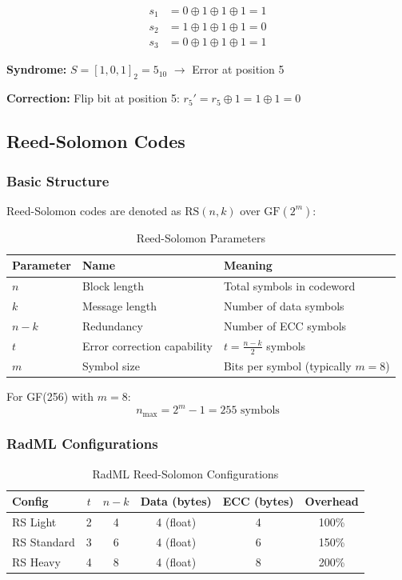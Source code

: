 \documentclass[11pt,a4paper]{article}
\begin{document}
\begin{align}
s_1 &= 0 \oplus 1 \oplus 1 \oplus 1 = 1 \\
s_2 &= 1 \oplus 1 \oplus 1 \oplus 1 = 0 \\
s_3 &= 0 \oplus 1 \oplus 1 \oplus 1 = 1
\end{align}

\textbf{Syndrome:} $S = [1, 0, 1]_2 = 5_{10}$ $\to$ Error at position 5 \checkmark

\textbf{Correction:} Flip bit at position 5: $r_5' = r_5 \oplus 1 = 1 \oplus 1 = 0$

\subsection{Reed-Solomon Codes}

\subsubsection{Basic Structure}

Reed-Solomon codes are denoted as $\text{RS}(n, k)$ over $\text{GF}(2^m)$:

\begin{table}[htbp]
\centering
\caption{Reed-Solomon Parameters}
\begin{tabular}{@{}lll@{}}
\toprule
\textbf{Parameter} & \textbf{Name} & \textbf{Meaning} \\ \midrule
$n$ & Block length & Total symbols in codeword \\
$k$ & Message length & Number of data symbols \\
$n - k$ & Redundancy & Number of ECC symbols \\
$t$ & Error correction capability & $t = \frac{n-k}{2}$ symbols \\
$m$ & Symbol size & Bits per symbol (typically $m=8$) \\ \bottomrule
\end{tabular}
\end{table}

For GF(256) with $m=8$:
\begin{equation}
n_{\max} = 2^m - 1 = 255 \text{ symbols}
\end{equation}

\subsubsection{RadML Configurations}

\begin{table}[htbp]
\centering
\caption{RadML Reed-Solomon Configurations}
\begin{tabular}{@{}lccccc@{}}
\toprule
\textbf{Config} & $t$ & $n-k$ & \textbf{Data (bytes)} & \textbf{ECC (bytes)} & \textbf{Overhead} \\ \midrule
RS Light & 2 & 4 & 4 (float) & 4 & 100\% \\
RS Standard & 3 & 6 & 4 (float) & 6 & 150\% \\
RS Heavy & 4 & 8 & 4 (float) & 8 & 200\% \\ \bottomrule
\end{tabular}
\end{table}
\end{document}
